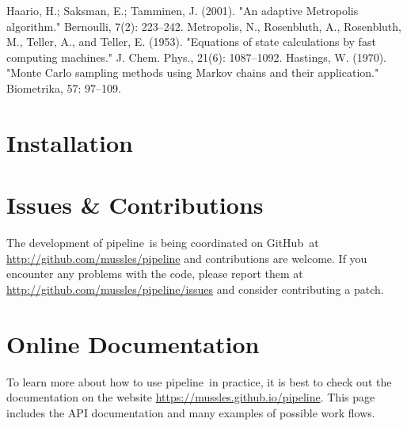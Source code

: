 \documentclass[12pt,preprint]{aastex}
\newcommand{\project}[1]{{\sffamily #1}}
\newcommand{\github}{\project{GitHub}}
\newcommand{\thisplain}{pipeline}
\newcommand{\this}{\project{\thisplain}}
\newcommand{\sectlabel}[1]{\label{sect:#1}}
\begin{document}
\begin{thebibliography}{}\raggedright
{}
    Haario, H.; Saksman, E.; Tamminen, J. (2001). "An adaptive Metropolis algorithm." Bernoulli, 7(2): 223–242.
    Metropolis, N., Rosenbluth, A., Rosenbluth, M., Teller, A., and Teller, E. (1953). "Equations of state calculations by fast computing machines." J. Chem. Phys., 21(6): 1087–1092.
    Hastings, W. (1970). "Monte Carlo sampling methods using Markov chains and their application." Biometrika, 57: 97–109.
\end{thebibliography}

\clearpage
\appendix
\section{Installation}\sectlabel{install}

\section{Issues \& Contributions}

The development of \this\ is being coordinated on \github\ at
\url{http://github.com/mussles/pipeline} and contributions are welcome. If you
encounter any problems with the code, please report them at
\url{http://github.com/mussles/pipeline/issues} and consider
contributing a patch.

\section{Online Documentation}

To learn more about how to use \this\ in practice, it is best to check out the
documentation on the website \url{https://mussles.github.io/pipeline}. This page includes
the API documentation and many examples of possible work flows.
\end{document}
